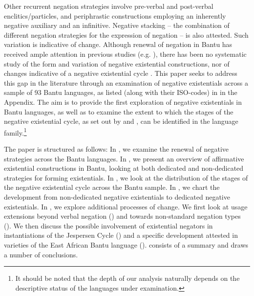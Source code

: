 \documentclass[output=paper]{langsci/langscibook}
\begin{document}
Other recurrent negation strategies involve pre-verbal and post-verbal
enclitics/particles, and periphrastic constructions employing an inherently
negative auxiliary and an infinitive. Negative stacking -- the combination
of different negation strategies for the expression of negation -- is also
attested. Such variation is indicative of change. Although renewal of
negation in Bantu has received ample attention in previous studies (e.g.
\citealt{KambaMuzenga1981,Guldemann1996,Guldemann1999,DevosAuwera2013,DevosOlmen2013}), there has been no systematic study of the
form and variation of negative existential constructions, nor of changes
indicative of a negative existential cycle
\parencites{Croft1991}{Veselinova2016}. This paper seeks
to address this gap in the literature through an examination of negative
existentials across a sample of 93 Bantu languages, as listed (along with
their ISO-codes) in  in the Appendix. The aim is to provide
the first exploration of negative existentials in Bantu languages, as well
as to examine the extent to which the stages of the negative existential
cycle, as set out by \citet{Croft1991} and
\citet{Veselinova2016}, can be identified in the
language family.\footnote{It should be noted that the depth of our analysis
naturally depends on the descriptive status of the languages under
examination.}

The paper is structured as follows: In ,
 we examine the renewal of negative strategies across the Bantu languages.
 In , we present an overview of affirmative existential
 constructions in Bantu, looking at both dedicated and non-dedicated
 strategies for forming existentials. In , we look at the
 distribution of the stages of the negative existential cycle across the
 Bantu sample. In , we chart the development from
 non-dedicated negative existentials to dedicated negative existentials. In
 , we explore additional processes of change. We first
 look at usage extensions beyond verbal negation () and
 towards non-standard negation types (). We then discuss the possible involvement of existential negators in instantiations of the Jespersen Cycle () and a specific development attested in varieties of the East African Bantu language  ().  consists of a summary and draws a number of conclusions.
\end{document}
